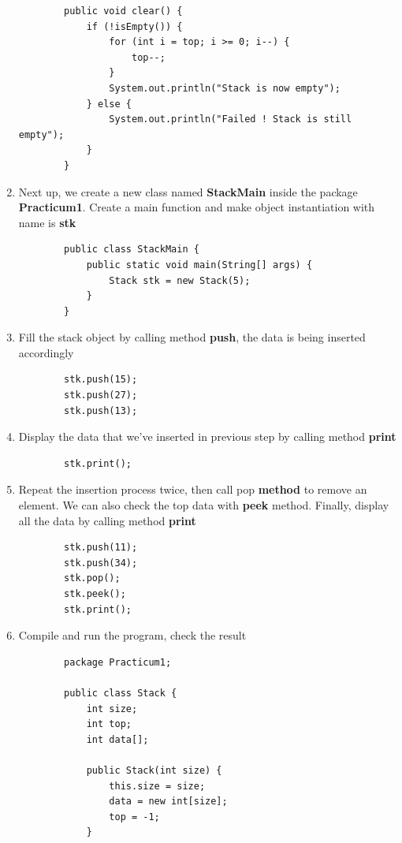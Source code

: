 \documentclass[12pt,titlepage]{article}
\begin{document}
\begin{enumerate}
    \begin{verbatim}
        public void clear() {
            if (!isEmpty()) {
                for (int i = top; i >= 0; i--) {
                    top--;
                }
                System.out.println("Stack is now empty");
            } else {
                System.out.println("Failed ! Stack is still empty");
            }
        }
    \end{verbatim}
    \item Next up, we create a new class named \textbf{StackMain} inside the package \textbf{Practicum1}. Create a main function and make object instantiation with name is \textbf{stk}
    \begin{verbatim}
        public class StackMain {
            public static void main(String[] args) {
                Stack stk = new Stack(5);
            }
        }
    \end{verbatim}
    \item Fill the stack object by calling method \textbf{push}, the data is being inserted accordingly
    \begin{verbatim}
        stk.push(15);
        stk.push(27);
        stk.push(13);
    \end{verbatim}
    \item Display the data that we’ve inserted in previous step by calling method \textbf{print}
    \begin{verbatim}
        stk.print();
    \end{verbatim}
    \item Repeat the insertion process twice, then call pop \textbf{method} to remove an element. We can also check the top data with \textbf{peek} method. Finally, display all the data by calling method \textbf{print}
    \begin{verbatim}
        stk.push(11);
        stk.push(34);
        stk.pop();
        stk.peek();
        stk.print();
    \end{verbatim}
    \item Compile and run the program, check the result
    \begin{verbatim}
        package Practicum1;

        public class Stack {
            int size;
            int top;
            int data[];

            public Stack(int size) {
                this.size = size;
                data = new int[size];
                top = -1;
            }


\end{verbatim}
\end{enumerate}
\end{document}
